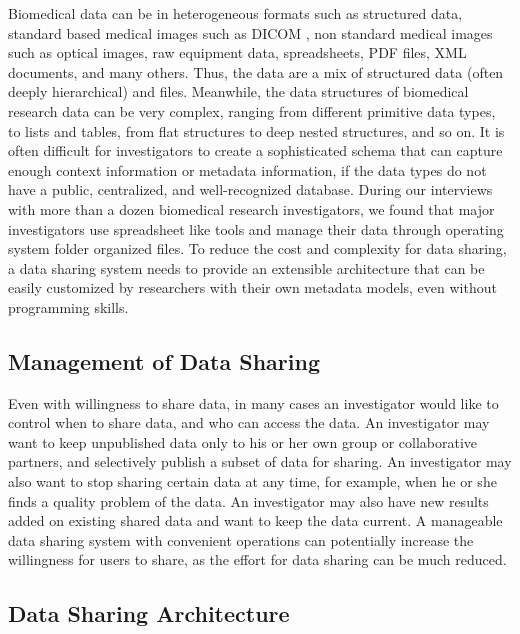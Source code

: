\documentclass{doublecol-new}
\theoremstyle{TH}{
\newtheorem{lemma}{Lemma}
\newtheorem{theorem}[lemma]{Theorem}
\newtheorem{corrolary}[lemma]{Corrolary}
\newtheorem{conjecture}[lemma]{Conjecture}
\newtheorem{proposition}[lemma]{Proposition}
\newtheorem{claim}[lemma]{Claim}
\newtheorem{stheorem}[lemma]{Wrong Theorem}
\newtheorem{algorithm}{Algorithm}
}
\theoremstyle{THrm}{
\newtheorem{definition}{Definition}[section]
\newtheorem{question}{Question}[section]
\newtheorem{remark}{Remark}
\newtheorem{scheme}{Scheme}
}
\theoremstyle{THhit}{
\newtheorem{case}{Case}[section]
}
\begin{document}
Biomedical data can be in heterogeneous formats such as structured
data, standard based medical images such as DICOM \cite{dicom}, non
standard medical images such as optical images, raw equipment data,
spreadsheets, PDF files,  XML documents, and many others. Thus, the
data are  a mix of structured data (often deeply hierarchical) and
files. Meanwhile, the data structures of biomedical research data
can be very complex, ranging from different primitive data types, to
lists and tables, from flat structures to deep nested structures,
and so on.  It is often difficult for investigators to create a
sophisticated schema that can capture enough context information or
metadata information, if the data types do not have a public,
centralized, and well-recognized database. During our interviews
with more than a dozen biomedical research investigators, we found
that major investigators use spreadsheet like tools and manage their
data through operating system folder organized files. To reduce the
cost and complexity for data sharing, a data sharing system needs to
provide an extensible architecture that can be easily customized by
researchers with their own metadata models, even without programming
skills.

\subsection{Management of Data Sharing}

Even with willingness to share data, in many cases an investigator
would like to control when to share data, and who can access the
data. An investigator may want to keep unpublished data only to his
or her own group or collaborative partners, and selectively publish
a subset of data for sharing. An investigator may also want to stop
sharing certain data at any time, for example, when he or she finds
a quality problem of the data. An investigator may also have new
results added on existing shared data and want to keep the data
current. A manageable data sharing system with convenient operations
can potentially increase the willingness for users to share, as the
effort for data sharing can be much reduced.


\subsection{Data Sharing Architecture}
\end{document}
